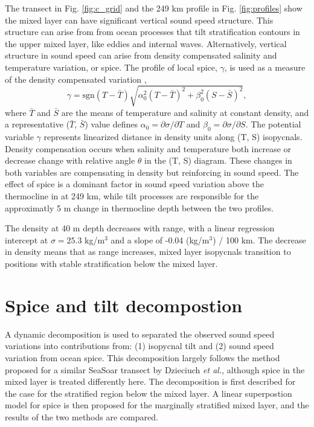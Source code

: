 \documentclass[preprint,NumberedRefs]{JASA}
\begin{document}
The transect in Fig. \ref{fig:c_grid} and the 249 km profile in Fig. \ref{fig:profiles} show the mixed layer can have significant vertical sound speed structure. This structure can arise from from ocean processes that tilt stratification contours in the upper mixed layer, like eddies and internal waves. Alternatively, vertical structure in sound speed can arise from density compensated salinity and temperature variation, or spice. The profile of local spice, $\gamma$, is used as a measure of the density compensated variation \citep{klymak2015spice},
\begin{equation}
    \gamma=\textrm{sgn}(T-\bar{T}) \sqrt{\alpha_0^2(T-\bar{T})^2 +\beta_0^2(S-\bar{S})^2},
    \label{eq:gamma}
\end{equation}
where $\bar{T}$ and $\bar{S}$ are the means of temperature and salinity at constant density, and a representative ($\bar{T}$, $\bar{S}$) value defines $\alpha_0=\partial \sigma / \partial T$ and $\beta_0=\partial \sigma / \partial S$. The potential variable $\gamma$ represents linearized distance in density units along (T, S) isopycnals. Density compensation occurs when salinity and temperature both increase or decrease change with relative angle $\theta$ in the (T, S) diagram. These changes in both variables are compensating in density but reinforcing in sound speed. The effect of spice is a dominant factor in sound speed variation above the thermocline in at 249 km, while tilt processes are responsible for the approximatly 5 m change in thermocline depth between the two profiles.

The density at 40 m depth decreases with range, with a linear regression intercept at $\sigma=25.3$ kg/m$^3$ and a slope of -0.04 (kg/m$^3$) / 100 km. The decrease in density means that as range increases, mixed layer isopycnals transition to positions with stable stratification below the mixed layer.

\section{\label{sec:decomposition}Spice and tilt decompostion}
A dynamic decomposition is used to separated the observed sound speed variations into contributions from: (1) isopycnal tilt and (2) sound speed variation from ocean spice. This decomposition largely follows the method proposed for a similar SeaSoar transect by Dzieciuch \emph{et al.}\citep{dzieciuch2004}, although spice in the mixed layer is treated differently here. The decomposition is first described for the case for the stratified region below the mixed layer. A linear superpostion model for spice is then proposed for the marginally stratified mixed layer, and the results of the two methods are compared.
\end{document}
